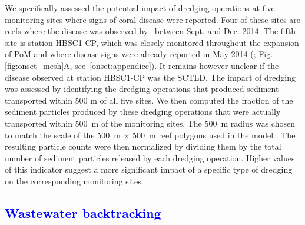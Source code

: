 \documentclass[preprint,12pt,authoryear]{elsarticle}
\newcommand{\modif}[1]{\textcolor{blue}{#1}}
\begin{document}
We specifically assessed the potential impact of dredging operations at five monitoring sites where signs of coral disease were reported. Four of these sites are reefs where the disease was observed by~\cite{precht2016unprecedented} between Sept. and Dec. 2014. The fifth site is station HBSC1-CP, which was closely monitored throughout the expansion of PoM and where disease signs were already reported in May 2014 (\citealp{dial2017}; Fig. \ref{fig:onset_mesh}A, see~\ref{onset:appendice}). It remains however unclear if the disease observed at station HBSC1-CP was the SCTLD. The impact of dredging was assessed by identifying the dredging operations that produced sediment transported within 500 m of all five sites. We then computed the fraction of the sediment particles produced by these dredging operations that were actually transported within 500~m of the monitoring sites. The 500~m radius was chosen to match the scale of the 500~m $\times$ 500~m reef polygons used in the model \citep{dobbelaere2020coupled}. The resulting particle counts were then normalized by dividing them by the total number of sediment particles released by each dredging operation. Higher values of this indicator suggest a more significant impact of a specific type of dredging on the corresponding monitoring sites.

\modif{\subsection{Wastewater backtracking}}
\end{document}
